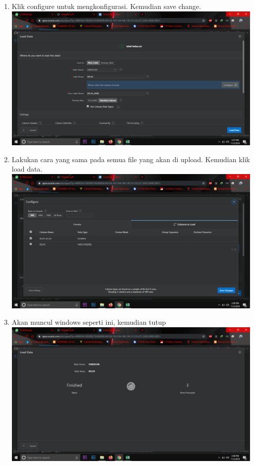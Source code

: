 \begin{enumerate}
\item Klik configure untuk mengkonfigurasi. Kemudian save change.\\
\includegraphics[scale = 0.3]{gambar/4.png}

\item Lakukan cara yang sama pada semua file yang akan di upload. Kemudian klik load data.\\
\includegraphics[scale = 0.3]{gambar/5.png}

\item Akan muncul windows seperti ini, kemudian tutup \\
\includegraphics[scale = 0.3]{gambar/6.png}


\end{enumerate}
